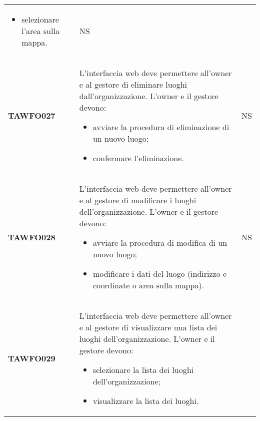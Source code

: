 \documentclass[../piano-di-qualifica.tex]{subfiles}
\begin{document}
\begin{longtable}[H]{>{\centering\bfseries}m{3cm} >{}m{11cm} >{\centering\arraybackslash}m{2cm}}
\begin{itemize}
    \item selezionare l'area sulla mappa.
  \end{itemize}
                                  & NS                                                                                                                                                                                                                                   \\
  TAWFO027                        & L’interfaccia web deve permettere all’owner e al gestore di eliminare luoghi dall’organizzazione. \newline
  L’owner e il gestore devono:
  \begin{itemize}
    \item avviare la procedura di eliminazione di un nuovo luogo;
    \item confermare l'eliminazione.
  \end{itemize}
                                  & NS                                                                                                                                                                                                                                   \\
  TAWFO028                        & L’interfaccia web deve permettere all’owner e al gestore di modificare i luoghi dell’organizzazione. \newline
  L’owner e il gestore devono:
  \begin{itemize}
    \item avviare la procedura di modifica di un nuovo luogo;
    \item modificare i dati del luogo (indirizzo e coordinate o area sulla mappa).
  \end{itemize}
                                  & NS                                                                                                                                                                                                                                   \\
  TAWFO029                        & L’interfaccia web deve permettere all’owner e al gestore di visualizzare una lista dei luoghi dell’organizzazione. \newline
  L’owner e il gestore devono:
  \begin{itemize}
    \item selezionare la lista dei luoghi dell'organizzazione;
    \item visualizzare la lista dei luoghi.

\end{itemize}
\end{longtable}
\end{document}
